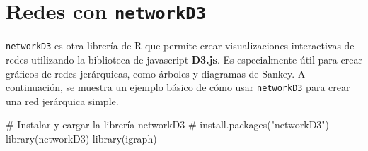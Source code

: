 \documentclass[
  letterpaper,
  DIV=11,
  numbers=noendperiod]{scrreprt}
\newenvironment{Shaded}{\begin{snugshade}}{\end{snugshade}}
\newcommand{\AttributeTok}[1]{\textcolor[rgb]{0.40,0.45,0.13}{#1}}
\newcommand{\CommentTok}[1]{\textcolor[rgb]{0.37,0.37,0.37}{#1}}
\newcommand{\FunctionTok}[1]{\textcolor[rgb]{0.28,0.35,0.67}{#1}}
\newcommand{\NormalTok}[1]{\textcolor[rgb]{0.00,0.23,0.31}{#1}}
\newcommand{\OtherTok}[1]{\textcolor[rgb]{0.00,0.23,0.31}{#1}}
\newcommand{\SpecialCharTok}[1]{\textcolor[rgb]{0.37,0.37,0.37}{#1}}
\newcommand{\StringTok}[1]{\textcolor[rgb]{0.13,0.47,0.30}{#1}}
\begin{document}
\section{\texorpdfstring{Redes con
\texttt{networkD3}}{Redes con networkD3}}\label{redes-con-networkd3}

\texttt{networkD3} es otra librería de R que permite crear
visualizaciones interactivas de redes utilizando la biblioteca de
javascript \textbf{D3.js}. Es especialmente útil para crear gráficos de
redes jerárquicas, como árboles y diagramas de Sankey. A continuación,
se muestra un ejemplo básico de cómo usar \texttt{networkD3} para crear
una red jerárquica simple.

\begin{Shaded}
\begin{Highlighting}[]
\CommentTok{\# Instalar y cargar la librería networkD3}
\CommentTok{\# install.packages("networkD3")}
\FunctionTok{library}\NormalTok{(networkD3)}
\FunctionTok{library}\NormalTok{(igraph)}
\end{Highlighting}
\end{Shaded}

\begin{Shaded}
\end{Shaded}
\end{document}
